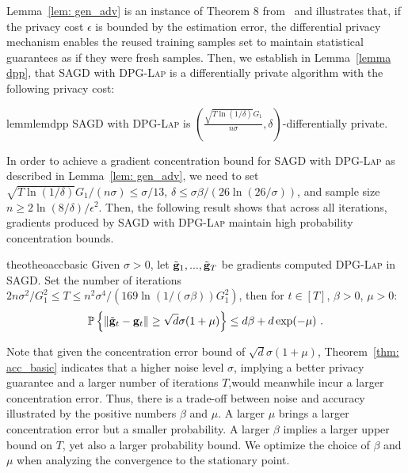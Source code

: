 \documentclass[11pt]{article}
\begin{document}
Lemma~\ref{lem: gen_adv} is an instance of Theorem 8 from~\cite{dwfe15} and illustrates that, if the privacy cost $\epsilon$ is bounded by the estimation error, the differential privacy mechanism enables the reused training samples set to maintain statistical guarantees as if they were fresh samples. 
Then, we establish in Lemma~\ref{lemma dpp}, that \textsc{SAGD} with \textsc{DPG-Lap} is a differentially private algorithm with the following privacy cost:
\begin{restatable}{lemm}{lemdpp}
\label{lemma dpp}
\textsc{SAGD} with \textsc{DPG-Lap} is $(\frac{\sqrt{T \ln(1/\delta)} G_1}{n\sigma}, \delta)$-differentially private. 
\end{restatable}  
In order to achieve a gradient concentration bound for \textsc{SAGD} with \textsc{DPG-Lap} as described in Lemma~\ref{lem: gen_adv}, we need to set $\sqrt{T \ln(1/\delta)} G_1/(n\sigma)\leq \sigma/13$, $\delta \leq \sigma \beta/(26 \ln(26/\sigma))$, and  sample size $n \geq 2\ln(8/\delta)/\epsilon^2$. 
Then, the following result shows that across all iterations, gradients produced by \textsc{SAGD} with \textsc{DPG-Lap} maintain high probability concentration bounds.

\begin{restatable}{theo}{theoaccbasic}
\label{thm: acc_basic}
Given $\sigma > 0$, let $\tilde {\mathbf{g}}_1,...,  \tilde {\mathbf{g}}_T$ be gradients computed \textsc{DPG-Lap} in \textsc{SAGD}. Set the number of iterations $ 2n\sigma^2/G_1^2\leq T \leq n^2 \sigma^4/(169 \ln(1/(\sigma \beta))G_1^2)$, then for $t \in [T]$, $\beta >0$, $\mu > 0$:
    \begin{equation*}
    \mathbb{P}\left\{\|\tilde {\mathbf{g}}_t - \mathbf{g}_t\| \geq \sqrt{d}\sigma(1+\mu)\right\} \leq d\beta + d\exp(-\mu)~.
    \end{equation*}
\end{restatable}
Note that given the concentration error bound of $\sqrt{d}\sigma(1+\mu)$, Theorem~\ref{thm: acc_basic} indicates that a higher noise level $\sigma$, implying a better privacy guarantee and a larger number of iterations $T$,would meanwhile incur a larger concentration error.
Thus, there is a trade-off between noise and accuracy illustrated by the positive numbers $\beta$ and $\mu$.
A larger $\mu$ brings a larger concentration error but a smaller probability. 
A larger $\beta$ implies a larger upper bound on $T$, yet also a larger probability bound. 
We optimize the choice of $\beta$ and $\mu$ when analyzing the convergence to the stationary point.
\end{document}

